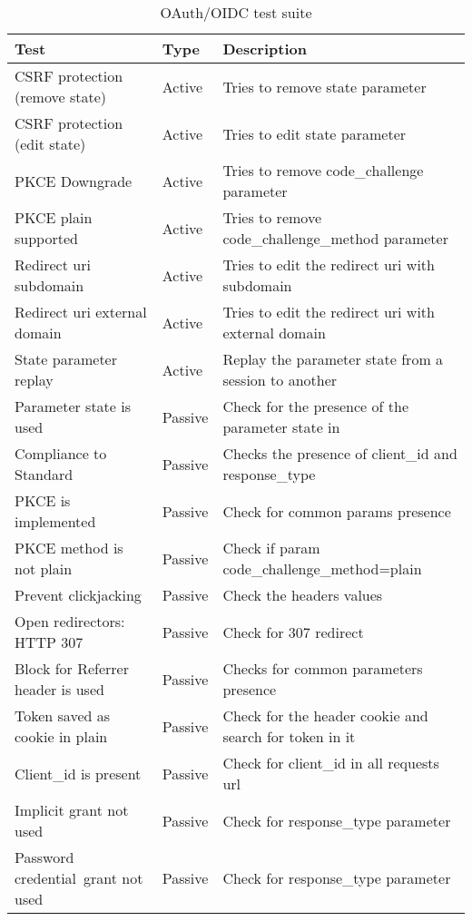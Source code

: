 \begin{table}[h]
    \begin{tabular}{|l|l|l|}
        \hline
        Test                                   & Type         & Description                             \\
        \hline\hline
        CSRF protection (remove state)          & Active        & Tries to remove state parameter \\
        CSRF protection (edit state)    &   Active  &   Tries to edit state parameter\\
        PKCE Downgrade                  &   Active  &   Tries to remove code\_challenge parameter \\
        PKCE plain supported            &   Active  &   Tries to remove code\_challenge\_method parameter \\
        Redirect uri subdomain          &   Active  &   Tries to edit the redirect uri with subdomain \\
        Redirect uri external domain    &   Active  &   Tries to edit the redirect uri with external domain \\
        State parameter replay          &   Active  &   Replay the parameter state from a session to another \\
        Parameter state is used         &   Passive  &   Check for the presence of the parameter state in \\
        Compliance to Standard          &   Passive  &   Checks the presence of client\_id and response\_type\\
        PKCE is implemented             &   Passive &   Check for common params presence \\
        PKCE method is not plain        &   Passive &   Check if param code\_challenge\_method=plain \\
        Prevent clickjacking            &   Passive &   Check the headers values \\
        Open redirectors: HTTP 307      &   Passive &   Check for 307 redirect \\
        Block for Referrer header is used  &    Passive &   Checks for common parameters presence \\
        Token saved as cookie in plain  &   Passive &   Check for the header cookie and search for token in it\\
        Client\_id is present            &   Passive &   Check for client\_id in all requests url \\
        Implicit grant not used         &   Passive &   Check for response\_type parameter \\ 
        Password credential\ grant not used  &   Passive &   Check for response\_type parameter \\
        \hline
    \end{tabular}
    \caption{\label{tab:OAuth_test_suite}OAuth/OIDC test suite}
\end{table}

